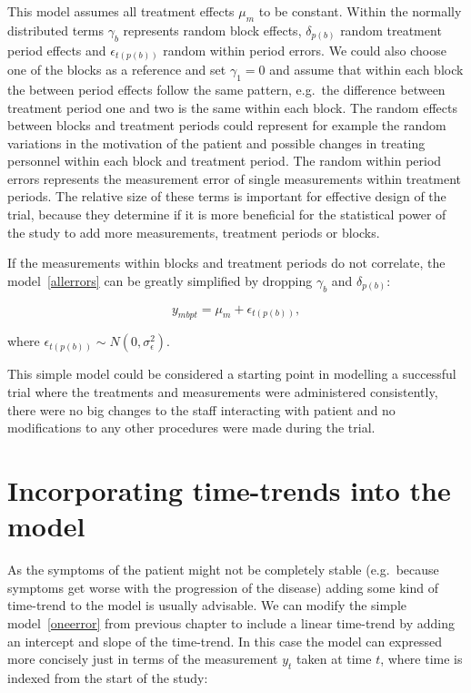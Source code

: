 \documentclass[12pt,a4paper,leqno]{report}
\theoremstyle{plain}
\theoremstyle{definition}
\theoremstyle{remark}
\begin{document}
This model assumes all treatment effects \(\mu_m\) to be constant. Within the
normally distributed terms \(\gamma_b\) represents random block effects,
\(\delta_{p(b)}\) random treatment period effects and \(\epsilon_{t(p(b))}\) random within
period errors. We could also choose one of the blocks as a reference and set
\(\gamma_1 = 0\) and assume that within each block the between period effects
follow the same pattern, e.g.\ the difference between treatment period one and
two is the same within each block. The random effects between blocks and treatment
periods could represent for example the random variations in the motivation of the patient and possible
changes in treating personnel within each block and treatment period. The random
within period errors represents the measurement error of single measurements
within treatment periods. The relative size of these terms is important
for effective design of the trial, because they determine if it is more
beneficial for the statistical power of the study to add more measurements,
treatment periods or blocks.

If the measurements within blocks and treatment periods do not correlate, the
model\ \ref{allerrors} can be greatly simplified by dropping \(\gamma_b\) and
\(\delta_{p(b)}\):

\begin{def}\label{}
    \begin{equation}\label{oneerror}
        y_{mbpt} = \mu_m + \epsilon_{t(p(b))},
    \end{equation}
\end{def}where \(\epsilon_{t(p(b))} \sim N(0,\sigma^2_{\epsilon})\).

This simple model could be considered a starting point in modelling a successful trial where
the treatments and measurements were administered consistently, there were no big changes to the staff interacting
with patient and no modifications to any other procedures were made during
the trial.

\section{Incorporating time-trends into the model}\label{timetrends}

As the symptoms of the patient might not be completely stable (e.g.\ because
symptoms get worse with the progression of the disease) adding some kind of
time-trend to the model is usually advisable. We can modify the simple model\ \ref{oneerror} from previous chapter to include a linear time-trend by adding an
intercept and slope of the time-trend. In this case the model can expressed more
concisely just in terms of the measurement \(y_t\) taken at time \(t\), where
time is indexed from the start of the study:
\end{document}
